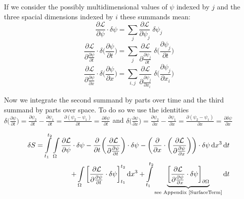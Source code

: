 \documentclass{article}
\DeclareMathOperator{\dd}{d\!}
\begin{document}
If we consider the possibly multidimensional values of $\psi$ indexed by $j$ and the three spacial dimensions indexed by $i$ these summands mean:
\begin{equation}
\frac{\partial \mathcal{L}}{\partial \psi} \cdot \delta \psi 
= \sum_{j} \frac{\partial \mathcal{L}}{\partial \psi_{j}} \; \delta \psi_{j} 
\end{equation}
\begin{equation}
\frac{\partial \mathcal{L}}{\partial \frac{\partial \psi}{\partial t}} \cdot \delta \bigg(\frac{\partial \psi} {\partial t}\bigg)
= \sum_{j} \frac{\partial \mathcal{L}}{\partial \frac{\partial \psi_{j}}{\partial t}} \; \delta \bigg(\frac{\partial \psi_{j}} {\partial t}\bigg)
\end{equation}
\begin{equation}
\frac{\partial \mathcal{L}}{\partial \frac{\partial \psi}{\partial x}} \cdot \delta \bigg(\frac{\partial \psi} {\partial x}\bigg)
= \sum_{i,j} \frac{\partial \mathcal{L}}{\partial \frac{\partial \psi_{j}}{\partial x_{i}}} \; \delta \bigg(\frac{\partial \psi_{j}} {\partial x_{i}}\bigg)
\end{equation}

Now we integrate the second summand by parts over time and the third summand by parts over space. To do so we use the identities 
$\delta \bigg(\frac{\partial \psi} {\partial t}\bigg) 
= \frac{\partial \psi_2} {\partial t} - \frac{\partial \psi_1} {\partial t}
= \frac{\partial (\psi_2 - \psi_1)} {\partial t}
= \frac{\partial \delta \psi} {\partial t}$ 
and
$\delta \bigg(\frac{\partial \psi} {\partial x}\bigg) 
= \frac{\partial \psi_2} {\partial x} - \frac{\partial \psi_1} {\partial x}
= \frac{\partial (\psi_2 - \psi_1)} {\partial x}
= \frac{\partial \delta \psi} {\partial x}$ 

\begin{equation} \label{calcDeltaSSection2}
\begin{split}
\delta S = \int\limits_{t_1}^{t_2} \int\limits_{\Omega} 
\frac{\partial \mathcal{L}}{\partial \psi} \cdot \delta \psi
-\frac{\partial}{\partial t} \bigg( \frac{\partial \mathcal{L}}{\partial \frac{\partial \psi}{\partial t}} \bigg) \cdot \delta \psi
-\bigg(\frac{\partial}{\partial x} \cdot \bigg( \frac{\partial \mathcal{L}}{\partial \frac{\partial \psi}{\partial x}} \bigg)\bigg) \cdot \delta \psi
\dd x^3 \dd t \\
+ \int\limits_{\Omega} \bigg[\frac{\partial \mathcal{L}}{\partial \frac{\partial \psi}{\partial t}} \cdot \delta \psi \bigg]_{t_1}^{t_2} \dd x^3
+ \int\limits_{t_1}^{t_2} 
\underbrace{
\bigg[\frac{\partial \mathcal{L}}{\partial \frac{\partial \psi}{\partial x}} \cdot \delta \psi \bigg]
_{\partial \Omega}
}_{\text{see Appendix \ref{SurfaceTerm}}} \dd t
\end{split}
\end{equation}
\end{document}
